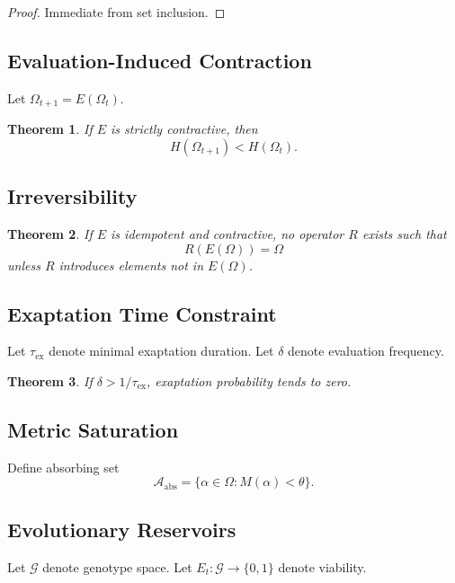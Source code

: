 \documentclass[11pt]{article}
\newtheorem{theorem}{Theorem}
\theoremstyle{definition}
\begin{document}
\begin{proof}
Immediate from set inclusion.
\end{proof}

\subsection{Evaluation-Induced Contraction}

Let $\Omega_{t+1} = E(\Omega_t)$.

\begin{theorem}
If $E$ is strictly contractive, then
\[
H(\Omega_{t+1}) < H(\Omega_t).
\]
\end{theorem}

\subsection{Irreversibility}

\begin{theorem}
If $E$ is idempotent and contractive, no operator $R$ exists such that
\[
R(E(\Omega)) = \Omega
\]
unless $R$ introduces elements not in $E(\Omega)$.
\end{theorem}

\subsection{Exaptation Time Constraint}

Let $\tau_{\mathrm{ex}}$ denote minimal exaptation duration.
Let $\delta$ denote evaluation frequency.

\begin{theorem}
If $\delta > 1/\tau_{\mathrm{ex}}$, exaptation probability tends to zero.
\end{theorem}

\subsection{Metric Saturation}

Define absorbing set
\[
\mathcal{A}_{\mathrm{abs}} = \{ \alpha \in \Omega : M(\alpha) < \theta \}.
\]

\subsection{Evolutionary Reservoirs}

Let $\mathcal{G}$ denote genotype space.
Let $E_t:\mathcal{G} \to \{0,1\}$ denote viability.
\end{document}
